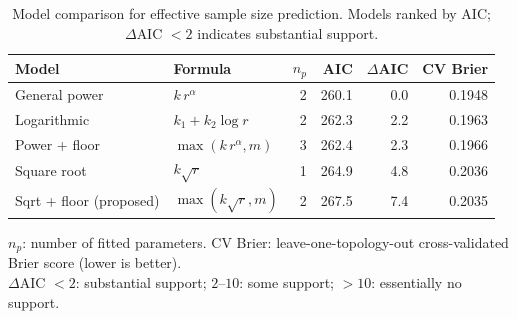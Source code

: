 \begin{table}[htbp]
\centering
\caption{Model comparison for effective sample size prediction.
Models ranked by AIC; $\Delta$AIC $< 2$ indicates substantial support.}
\label{tab:model_comparison}
\begin{tabular}{llrrrr}
\toprule
\textbf{Model} & \textbf{Formula} & $n_p$ & \textbf{AIC} & $\Delta$\textbf{AIC} & \textbf{CV Brier} \\
\midrule
General power & $k \, r^{\alpha}$ & 2 & 260.1 & 0.0 & 0.1948 \\
Logarithmic & $k_1 + k_2 \log r$ & 2 & 262.3 & 2.2 & 0.1963 \\
Power + floor & $\max(k \, r^{\alpha}, m)$ & 3 & 262.4 & 2.3 & 0.1966 \\
Square root & $k \sqrt{r}$ & 1 & 264.9 & 4.8 & 0.2036 \\
Sqrt + floor (proposed) & $\max(k\sqrt{r}, m)$ & 2 & 267.5 & 7.4 & 0.2035 \\
\bottomrule
\end{tabular}

\vspace{0.5em}
\footnotesize
$n_p$: number of fitted parameters. CV Brier: leave-one-topology-out cross-validated Brier score (lower is better).\\
$\Delta$AIC $< 2$: substantial support; $2$--$10$: some support; $> 10$: essentially no support.
\end{table}
